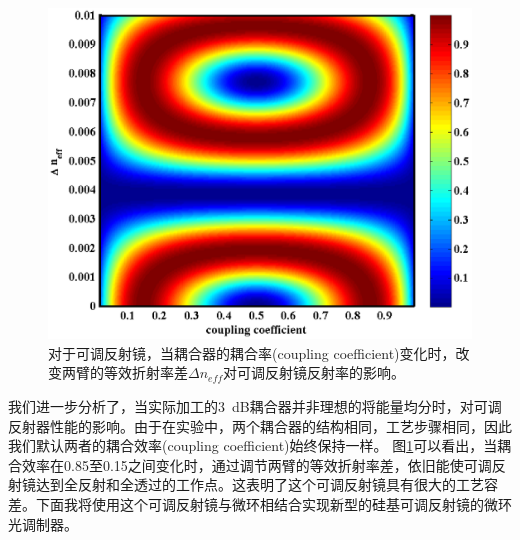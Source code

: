 \begin{figure}[htb]
	\centering
	\includegraphics[width=15cm]{./Pictures/chapt5_grating_ring_real_3dB.eps}
	\caption{对于可调反射镜，当耦合器的耦合率(coupling coefficient)变化时，改变两臂的等效折射率差$\Delta n_{eff}$对可调反射镜反射率的影响。}
	\label{chapt5_grating_ring_real_3dB}
\end{figure}
我们进一步分析了，当实际加工的3~dB耦合器并非理想的将能量均分时，对可调反射器性能的影响。由于在实验中，两个耦合器的结构相同，工艺步骤相同，因此我们默认两者的耦合效率(coupling coefficient)始终保持一样。 图\ref{chapt5_grating_ring_real_3dB}可以看出，当耦合效率在0.85至0.15之间变化时，通过调节两臂的等效折射率差，依旧能使可调反射镜达到全反射和全透过的工作点。这表明了这个可调反射镜具有很大的工艺容差。下面我将使用这个可调反射镜与微环相结合实现新型的硅基可调反射镜的微环光调制器。

